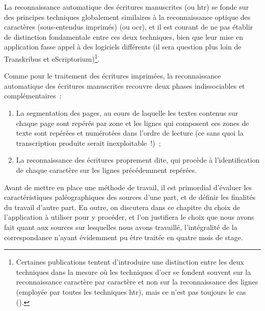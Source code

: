 \documentclass[a4paper,12pt,twoside]{book}
\begin{document}
		La reconnaissance automatique des écritures manuscrites (ou \gls{htr}) se fonde sur des principes techniques globalement similaires à la reconnaissance optique des caractères (sous-entendus imprimés) (ou \gls{ocr}), et il est courant de ne pas établir de distinction fondamentale entre ces deux techniques, bien que leur mise en application fasse appel à des logiciels différents (il sera question plus loin de Transkribus et eScriptorium)\footnote{Certaines publications tentent d'introduire une distinction entre les deux techniques dans la mesure où les techniques d'\gls{ocr} se fondent souvent sur la reconnaissance caractère par caractère et non sur la reconnaissance des lignes (employée par toutes les techniques \gls{htr}), mais ce n'est pas toujours le cas (\cite{stokesEScriptoriumVREManuscript2021}).}.
		
		Comme pour le traitement des écritures imprimées, la reconnaissance automatique des écritures manuscrites recouvre deux phases indissociables et complémentaires~:
		
		\begin{enumerate}
			\item La segmentation des pages, au cours de laquelle les textes contenus sur chaque page sont repérés par zone et les lignes qui composent ces zones de texte sont repérées et numérotées dans l'ordre de lecture (ce sans quoi la transcription produite serait inexploitable~!)~;
			\item La reconnaissance des écritures proprement dite, qui procède à l'identification de chaque caractère sur les lignes précédemment repérées.
		\end{enumerate}
			
	
		Avant de mettre en place une méthode de travail, il est primordial d'évaluer les caractéristiques paléographiques des sources d'une part, et de définir les finalités du travail d'autre part. En outre, on discutera dans ce chapitre du choix de l'application à utiliser pour y procéder, et l'on justifiera le choix que nous avons fait quant aux sources sur lesquelles nous avons travaillé, l'intégralité de la correspondance n'ayant évidemment pu être traitée en quatre mois de stage.
		
\end{document}
